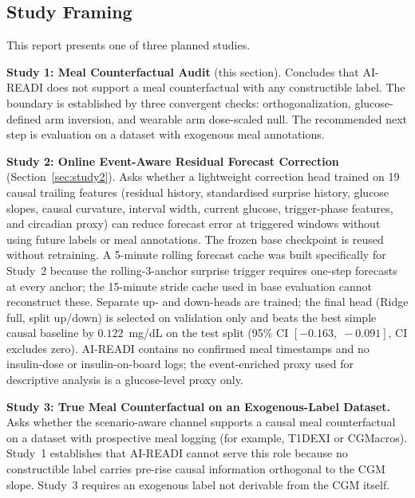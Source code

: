 \subsection{Study Framing}
\label{subsec:study_framing}

This report presents one of three planned studies.

\textbf{Study 1: Meal Counterfactual Audit} (this section). Concludes that AI-READI does not support a meal counterfactual with any constructible label. The boundary is established by three convergent checks: orthogonalization, glucose-defined arm inversion, and wearable arm dose-scaled null. The recommended next step is evaluation on a dataset with exogenous meal annotations.

\textbf{Study 2: Online Event-Aware Residual Forecast Correction} (Section~\ref{sec:study2}).
Asks whether a lightweight correction head trained on 19 causal trailing features
(residual history, standardised surprise history, glucose slopes, causal curvature,
interval width, current glucose, trigger-phase features, and circadian proxy) can
reduce forecast error at triggered windows without using future labels or meal
annotations.
The frozen base checkpoint is reused without retraining.
A 5-minute rolling forecast cache was built specifically for Study~2 because
the rolling-3-anchor surprise trigger requires one-step forecasts at every anchor;
the 15-minute stride cache used in base evaluation cannot reconstruct these.
Separate up- and down-heads are trained; the final head (Ridge full, split up/down)
is selected on validation only and beats the best simple causal baseline by
$0.122$~mg/dL on the test split (95\% CI $[-0.163,\;-0.091]$, CI excludes zero).
AI-READI contains no confirmed meal timestamps and no insulin-dose or
insulin-on-board logs; the event-enriched proxy used for descriptive analysis
is a glucose-level proxy only.

\textbf{Study 3: True Meal Counterfactual on an Exogenous-Label Dataset.}
Asks whether the scenario-aware channel supports a causal meal counterfactual on a
dataset with prospective meal logging (for example, T1DEXI or CGMacros).
Study~1 establishes that AI-READI cannot serve this role because no constructible
label carries pre-rise causal information orthogonal to the CGM slope.
Study~3 requires an exogenous label not derivable from the CGM itself.
